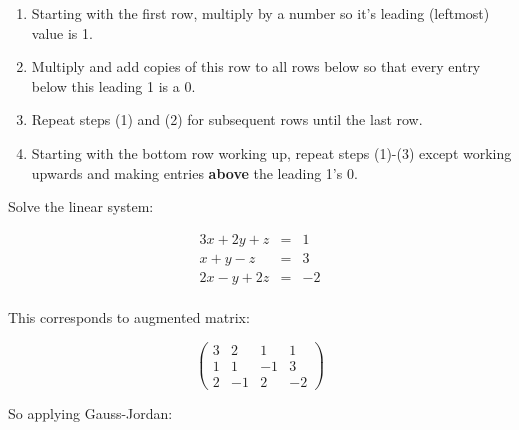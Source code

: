 \begin{enumerate}
    \item Starting with the first row, multiply by a number so it's leading (leftmost) value is 1.
    \item Multiply and add copies of this row to all rows below so that every entry below this leading 1 is a 0.
    \item Repeat steps (1) and (2) for subsequent rows until the last row.
    \item Starting with the bottom row working up, repeat steps (1)-(3) except working upwards and making entries \textbf{above} the leading 1's 0.
\end{enumerate}

\begin{example}\label{Example:GaussJordan}
Solve the linear system:

\begin{eqnarray*}
3x+2y+z&=&1\\
x+y-z&=&3\\
2x-y+2z&=&-2\\
\end{eqnarray*}

This corresponds to augmented matrix:


$$\left( \begin{array}{rrr|r}
3 & 2 & 1 & 1\\
1 & 1  & -1 & 3\\
2 & -1 & 2 & -2
\end{array}\right)$$

So applying Gauss-Jordan:


\end{example}
